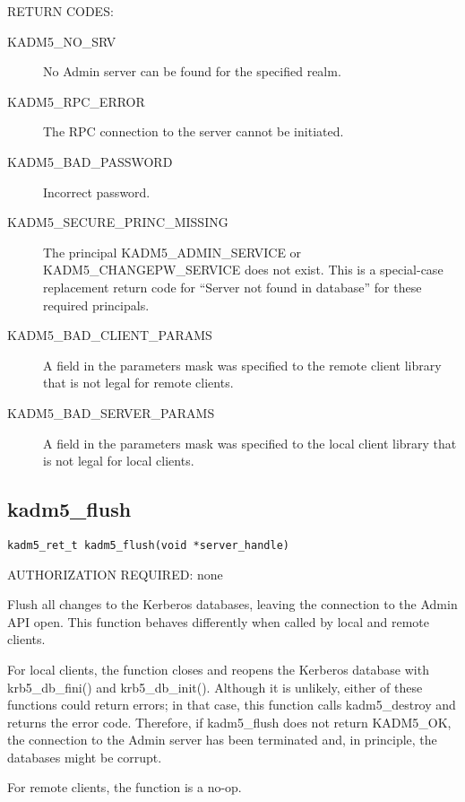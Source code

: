 RETURN CODES: 

\begin{description}
\item[KADM5_NO_SRV] No Admin server can be found for the
specified realm.

\item[KADM5_RPC_ERROR] The RPC connection to the server cannot be
initiated.

\item[KADM5_BAD_PASSWORD] Incorrect password.

\item[KADM5_SECURE_PRINC_MISSING] The principal
KADM5_ADMIN_SERVICE or KADM5_CHANGEPW_SERVICE does not
exist.  This is a special-case replacement return code for ``Server
not found in database'' for these required principals.

\item[KADM5_BAD_CLIENT_PARAMS] A field in the parameters mask was
specified to the remote client library that is not legal for remote
clients.

\item[KADM5_BAD_SERVER_PARAMS] A field in the parameters mask was
specified to the local client library that is not legal for local
clients.
\end{description}

\subsection{kadm5_flush}

\begin{verbatim}
kadm5_ret_t kadm5_flush(void *server_handle)
\end{verbatim}

AUTHORIZATION REQUIRED: none

Flush all changes to the Kerberos databases, leaving the connection to
the Admin API open.  This function behaves differently when called by
local and remote clients.

For local clients, the function closes and reopens the Kerberos
database with krb5_db_fini() and krb5_db_init().
Although it is unlikely, either of these functions
could return errors; in that case, this function calls
kadm5_destroy and returns the error code.  Therefore, if
kadm5_flush does not return KADM5_OK, the connection to the
Admin server has been terminated and, in principle, the databases
might be corrupt.

For remote clients, the function is a no-op.

